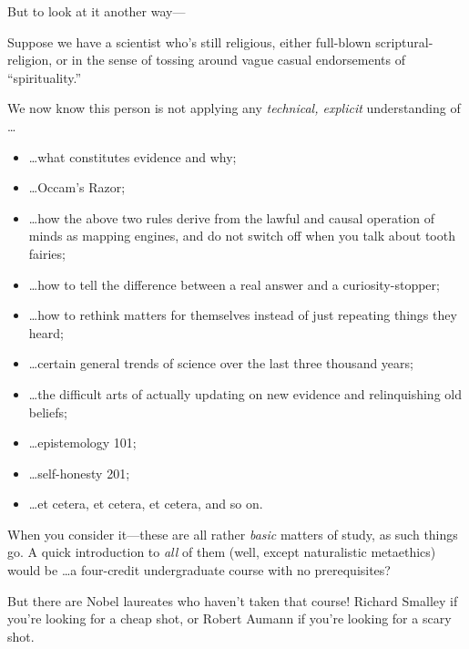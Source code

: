 {
 But to look at it another way---}

{
 Suppose we have a scientist who's still religious,
either full-blown scriptural-religion, or in the sense of tossing
around vague casual endorsements of
``spirituality.''}

{
 We now know this person is not applying any \textit{technical,
explicit} understanding of \ldots}

\begin{itemize}
\item {
 \ldots what constitutes evidence and why;}

\item {
 \ldots Occam's Razor;}

\item {
 \ldots how the above two rules derive from the lawful and causal
operation of minds as mapping engines, and do not switch off when you
talk about tooth fairies;}

\item {
 \ldots how to tell the difference between a real answer and a
curiosity-stopper;}

\item {
 \ldots how to rethink matters for themselves instead of just
repeating things they heard;}

\item {
 \ldots certain general trends of science over the last three
thousand years;}

\item {
 \ldots the difficult arts of actually updating on new evidence and
relinquishing old beliefs;}

\item {
 \ldots epistemology 101;}

\item {
 \ldots self-honesty 201;}

\item {
  \ldots et cetera, et cetera, et cetera, and so on.}
\end{itemize}

{
 When you consider it---these are all rather \textit{basic} matters
of study, as such things go. A quick introduction to \textit{all} of
them (well, except naturalistic metaethics) would be \ldots a
four-credit undergraduate course with no prerequisites?}

{
 But there are Nobel laureates who haven't taken
that course! Richard Smalley if you're looking for a
cheap shot, or Robert Aumann if you're looking for a
scary shot.}

